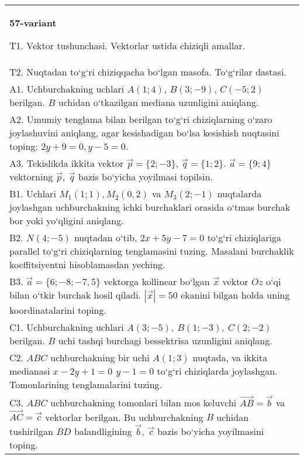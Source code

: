 \documentclass{article}
\begin{document}
\begin{tabular}{m{17cm}}
\textbf{57-variant}
\newline

T1. 
Vektor tushunchasi. Vektorlar ustida chiziqli amallar.
 \\
T2. 
Nuqtadan to‘g‘ri chiziqqacha bo‘lgan masofa. To‘g‘rilar dastasi.
 \\
A1. 
Uchburchakning uchlari $A (1;4) $, $B (3;-9) $, $C (-5;2) $
berilgan. $B$ uchidan o‘tkazilgan mediana uzunligini aniqlang.
 \\
A2. 
Umumiy tenglama bilan berilgan to‘g‘ri chiziqlarning
o‘zaro joylashuvini aniqlang, agar kesishadigan bo‘lsa kesishish nuqtasini
toping: $2y+9=0, y-5=0$.
 \\
A3. 
Tekislikda ikkita vektor
$\overrightarrow{p} = \{ 2; - 3\}$, $\overrightarrow{q} = \{ 1;2\}$.
$\overrightarrow{a} = \{9;4\}$ vektorning
$\overrightarrow{p},\ \overrightarrow{q}$ bazis bo‘yicha yoyilmasi topilsin.
 \\
B1. 
Uchlari \(M_{1} (1;1), M_{2} (0,2) \) va
\(M_{3} (2;-1) \) nuqtalarda joylashgan uchburchakning ichki 
burchaklari orasida o‘tmas burchak bor yoki yo‘qligini aniqlang.
 \\
B2. 
\(N (4;-5) \) nuqtadan o‘tib, $2x+5y-7=0$
to‘g‘ri chiziqlariga parallel to‘g‘ri chiziqlarning tenglamasini tuzing. Masalani burchaklik
koeffitsiyentni hisoblamasdan yeching.
 \\
B3. 
$\vec{a} = \{ 6; - 8; - 7,5\}$ vektorga kollinear bo‘lgan $\vec{x}$ vektor $Oz$ o‘qi bilan o‘tkir burchak hosil qiladi. $|\vec{x}| = 50$ ekanini bilgan holda uning koordinatalarini toping.
 \\
C1. 
Uchburchakning uchlari
\(A (3; - 5),\ B (1; - 3),\ C (2; - 2) \) berilgan. $B$ uchi tashqi
burchagi bessektrisa uzunligini aniqlang.
 \\
C2. 
$ABC$ uchburchakning bir uchi \(A (1;3) \) nuqtada,
va ikkita medianasi \(x - 2y + 1 = 0\,\ y - 1 = 0\) to‘g‘ri chiziqlarda
joylashgan. Tomonlarining tenglamalarini tuzing.
 \\
C3. 
\(ABC\) uchburchakning tomonlari bilan mos keluvchi \(\vec{AB} = \vec{b}\) va \(\vec{AC} = \vec{c}\) vektorlar berilgan. Bu uchburchakning \(B\) uchidan tushirilgan \(BD\) balandligining \(\vec{b},\ \vec{c}\) bazis bo‘yicha yoyilmasini toping.
 \\

\end{tabular}
\vspace{1cm}
\end{document}
